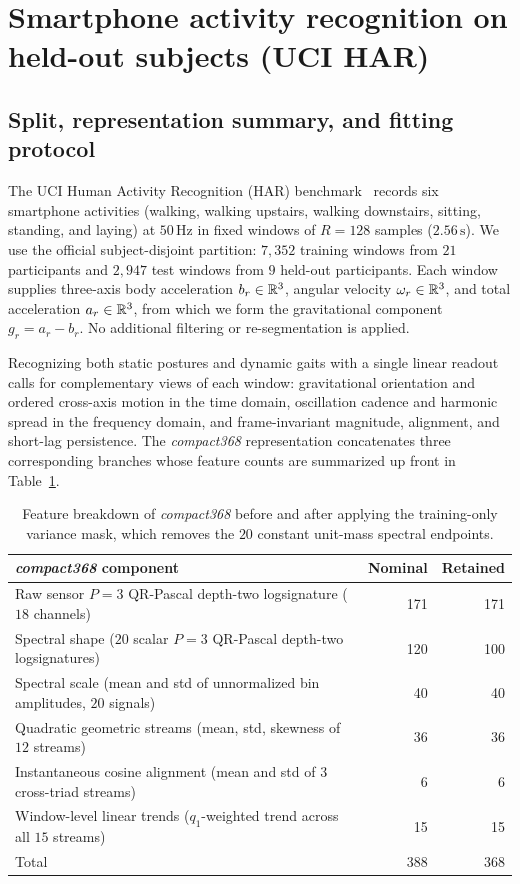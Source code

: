 \section{Smartphone activity recognition on held-out subjects (UCI HAR)}
\label{app:har}

\subsection{Split, representation summary, and fitting protocol}
The UCI Human Activity Recognition (HAR) benchmark~\cite{har} records six
smartphone activities (walking, walking upstairs, walking downstairs, sitting,
standing, and laying) at \(50\,\mathrm{Hz}\) in fixed windows of \(R = 128\)
samples (\(2.56\,\mathrm{s}\)). We use the official subject-disjoint partition:
\(7{,}352\) training windows from \(21\) participants and \(2{,}947\) test
windows from \(9\) held-out participants. Each window supplies three-axis body
acceleration \(b_r \in \mathbb{R}^3\), angular velocity \(\omega_r \in \mathbb{R}^3\), and total
acceleration \(a_r \in \mathbb{R}^3\), from which we form the gravitational component
\(g_r = a_r - b_r\). No additional filtering or re-segmentation is applied.

Recognizing both static postures and dynamic gaits with a single linear readout
calls for complementary views of each window: gravitational orientation and
ordered cross-axis motion in the time domain, oscillation cadence and harmonic
spread in the frequency domain, and frame-invariant magnitude, alignment, and
short-lag persistence. The \emph{compact368} representation concatenates three
corresponding branches whose feature counts are summarized up front in
Table~\ref{tab:compact-blocks}.

\begin{table}[ht]
\centering
\begin{tabular}{@{}lrr@{}}
\toprule
\emph{compact368} component & Nominal & Retained \\
\midrule
Raw sensor \(P=3\) QR-Pascal depth-two logsignature (\(18\) channels) & 171 & 171 \\
Spectral shape (\(20\) scalar \(P=3\) QR-Pascal depth-two logsignatures) & 120 & 100 \\
Spectral scale (mean and std of unnormalized bin amplitudes, \(20\) signals) & 40 & 40 \\
Quadratic geometric streams (mean, std, skewness of \(12\) streams) & 36 & 36 \\
Instantaneous cosine alignment (mean and std of \(3\) cross-triad streams) & 6 & 6 \\
Window-level linear trends (\(q_1\)-weighted trend across all \(15\) streams) & 15 & 15 \\
\midrule
Total & 388 & 368 \\
\bottomrule
\end{tabular}
\caption{Feature breakdown of \emph{compact368} before and after applying the
training-only variance mask, which removes the \(20\) constant unit-mass
spectral endpoints.}
\label{tab:compact-blocks}
\end{table}

